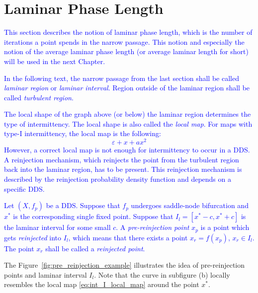 \section{Laminar Phase Length}

\textcolor{blue}{
This section describes the notion of laminar phase length, which is the number of iterations a point spends in the narrow passage.
This notion and especially the notion of the average laminar phase length (or average laminar length for short) will be used in the next Chapter.
}
\par
\textcolor{blue}{
In the following text, the narrow passage from the last section shall be called \emph{laminar region} or \emph{laminar interval}.
Region outside of the laminar region shall be called \emph{turbulent region}.
}
\par
\textcolor{blue}{
The local shape of the graph above (or below) the laminar region determines the type of intermittency.
The local shape is also called the \emph{local map}.
For maps with type-I intermittency, the local map is the following:
\begin{equation}
\varepsilon + x + a x^2 \label{eq:int_I_local_map}
\end{equation}
However, a correct local map is not enough for intermittency to occur in a DDS.
A reinjection mechanism, which reinjects the point from the turbulent region back into the laminar region, has to be present.
This reinjection mechanism is described by the reinjection probability density function and depends on a specific DDS.
}
\par
\textcolor{blue}{
Let $(X, f_{p})$ be a DDS. Suppose that $f_{p}$ undergoes saddle-node bifurcation and $x^{*}$ is the corresponding single fixed point.
Suppose that $I_l = [ x^{*}-c, x^{*}+c ]$ is the laminar interval for some small $c$.
A \emph{pre-reinjection point} $x_p$ is a point which gets \emph{reinjected} into $I_l$, which means that there exists a point $x_r = f(x_p)$, $x_r \in I_l$.
The point $x_r$ shall be called a \emph{reinjected point}.
}
\par
The Figure~\ref{fig:pre_reinjection_example} illustrates the idea of pre-reinjection points and laminar interval $I_l$.
Note that the curve in subfigure (b) locally resembles the local map \eqref{eq:int_I_local_map} around the point $x^{*}$.
